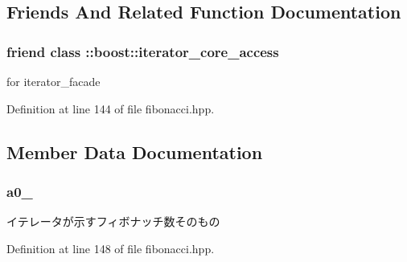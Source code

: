 \subsection{\-Friends \-And \-Related \-Function \-Documentation}
\hypertarget{classyuh_1_1range__detail_1_1fibonacci__iterator_a986bf0deaa7559f361d03122eeea4c86}{
\subsubsection[{\-::boost\-::iterator\-\_\-core\-\_\-access}]{\setlength{\rightskip}{0pt plus 5cm}friend class \-::boost\-::iterator\-\_\-core\-\_\-access}}\label{df/d65/classyuh_1_1range__detail_1_1fibonacci__iterator_a986bf0deaa7559f361d03122eeea4c86}
for iterator\-\_\-facade 

\-Definition at line 144 of file fibonacci.\-hpp.



\subsection{\-Member \-Data \-Documentation}
\hypertarget{classyuh_1_1range__detail_1_1fibonacci__iterator_a188fdb4f867cf1bd468eca769d02e4ba}{
\subsubsection[{a0\-\_\-}]{ {\bf a0\-\_\-}}}\label{df/d65/classyuh_1_1range__detail_1_1fibonacci__iterator_a188fdb4f867cf1bd468eca769d02e4ba}
イテレータが示すフィボナッチ数そのもの 

\-Definition at line 148 of file fibonacci.\-hpp.

